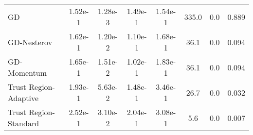 \documentclass{article}
\begin{document}
\begin{table}[htbp]
{\begin{tabular}{l*{7}{S[table-format=2.2e-1]}}
GD & 1.52e-1 & 1.28e-3 & 1.49e-1 & 1.54e-1 & 335.0 & 0.0 & 0.889 \\
GD-Nesterov & 1.62e-1 & 1.20e-2 & 1.10e-1 & 1.68e-1 & 36.1 & 0.0 & 0.094 \\
GD-Momentum & 1.65e-1 & 1.51e-2 & 1.02e-1 & 1.83e-1 & 36.1 & 0.0 & 0.094 \\
Trust Region-Adaptive & 1.93e-1 & 5.63e-2 & 1.48e-1 & 3.46e-1 & 26.7 & 0.0 & 0.032 \\
Trust Region-Standard & 2.52e-1 & 3.10e-2 & 2.04e-1 & 3.08e-1 & 5.6 & 0.0 & 0.007 \\
\bottomrule
\end{tabular}
}
\end{table}
\end{document}
